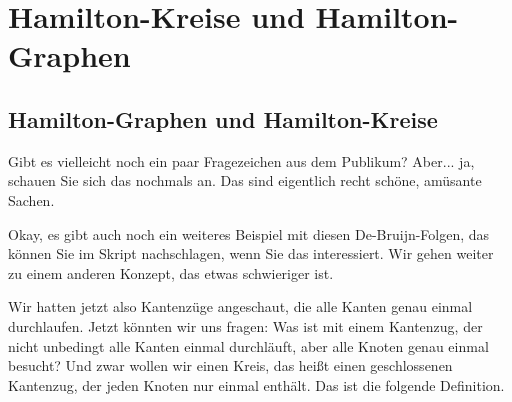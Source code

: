 
\section{Hamilton-Kreise und Hamilton-Graphen}

\subsection{Hamilton-Graphen und Hamilton-Kreise}

\begin{spoken-clean}[00:31:34 - 00:32:29]
Gibt es vielleicht noch ein paar Fragezeichen aus dem Publikum? Aber... ja, schauen Sie sich das nochmals an. Das sind eigentlich recht schöne, amüsante Sachen.

Okay, es gibt auch noch ein weiteres Beispiel mit diesen De-Bruijn-Folgen, das können Sie im Skript nachschlagen, wenn Sie das interessiert. Wir gehen weiter zu einem anderen Konzept, das etwas schwieriger ist.

Wir hatten jetzt also Kantenzüge angeschaut, die alle Kanten genau einmal durchlaufen. Jetzt könnten wir uns fragen: Was ist mit einem Kantenzug, der nicht unbedingt alle Kanten einmal durchläuft, aber alle Knoten genau einmal besucht? Und zwar wollen wir einen Kreis, das heißt einen geschlossenen Kantenzug, der jeden Knoten nur einmal enthält. Das ist die folgende Definition. 
\end{spoken-clean}

\begin{math-stroke}
\end{math-stroke}

